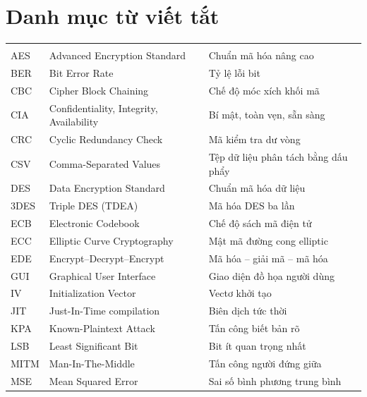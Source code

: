 \chapter*{Danh mục từ viết tắt}

{\small{}\renewcommand{\arraystretch}{1.12}
\begin{longtable}{@{}P{2.6cm}P{6.4cm}P{6.0cm}@{}}
\toprule
{} &  & \\
\midrule
\endfirsthead
\toprule
{} &  & \\
\midrule
\endhead
\bottomrule
\endfoot
AES     & Advanced Encryption Standard & Chuẩn mã hóa nâng cao\\
BER     & Bit Error Rate & Tỷ lệ lỗi bit\\
CBC     & Cipher Block Chaining & Chế độ móc xích khối mã\\
CIA     & Confidentiality, Integrity, Availability & Bí mật, toàn vẹn, sẵn sàng\\
CRC     & Cyclic Redundancy Check & Mã kiểm tra dư vòng\\
CSV     & Comma-Separated Values & Tệp dữ liệu phân tách bằng dấu phẩy\\
DES     & Data Encryption Standard & Chuẩn mã hóa dữ liệu\\
3DES    & Triple DES (TDEA) & Mã hóa DES ba lần\\
ECB     & Electronic Codebook & Chế độ sách mã điện tử\\
ECC     & Elliptic Curve Cryptography & Mật mã đường cong elliptic\\
EDE     & Encrypt--Decrypt--Encrypt & Mã hóa -- giải mã -- mã hóa\\
GUI     & Graphical User Interface & Giao diện đồ họa người dùng\\
IV      & Initialization Vector & Vectơ khởi tạo\\
JIT     & Just-In-Time compilation & Biên dịch tức thời\\
KPA     & Known-Plaintext Attack & Tấn công biết bản rõ\\
LSB     & Least Significant Bit & Bit ít quan trọng nhất\\
MITM    & Man-In-The-Middle & Tấn công người đứng giữa\\
MSE     & Mean Squared Error & Sai số bình phương trung bình\\

\end{longtable}}

